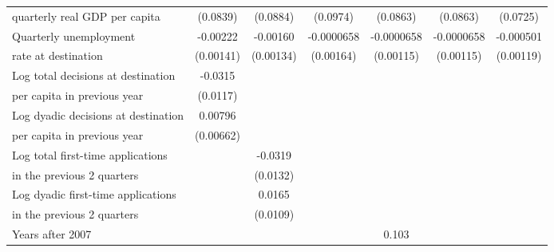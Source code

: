\begin{table}[!ht]
\begin{tabular}{l*{6}{c}}
 quarterly real GDP per capita                    &    (0.0839)         &    (0.0884)         &    (0.0974)         &    (0.0863)         &    (0.0863)         &    (0.0725)         \\
[0,5em]
Quarterly unemployment &    -0.00222         &    -0.00160         &  -0.0000658         &  -0.0000658         &  -0.0000658         &   -0.000501         \\
rate at destination                    &   (0.00141)         &   (0.00134)         &   (0.00164)         &   (0.00115)         &   (0.00115)         &   (0.00119)         \\
[0,5em]
Log total decisions at destination &     -0.0315\sym{**} &                     &                     &                     &                     &                     \\
per capita in previous year                    &    (0.0117)         &                     &                     &                     &                     &                     \\
[0,5em]
Log dyadic decisions at destination &     0.00796         &                     &                     &                     &                     &                     \\
per capita in previous year                    &   (0.00662)         &                     &                     &                     &                     &                     \\
[0,5em]
Log total first-time applications&                     &     -0.0319\sym{*}  &                     &                     &                     &                     \\
 in the previous 2 quarters                    &                     &    (0.0132)         &                     &                     &                     &                     \\
[0,5em]
Log dyadic first-time applications&                     &      0.0165         &                     &                     &                     &                     \\
 in the previous 2 quarters                    &                     &    (0.0109)         &                     &                     &                     &                     \\
[0,5em]
Years after 2007    &                     &                     &                     &       0.103\sym{**} &                     &                     \\

\end{tabular}
\end{table}
